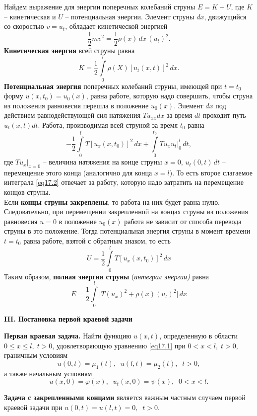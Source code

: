 Найдем выражение для энергии поперечных колебаний струны $E = K + U$, где $K$ -- кинетическая и $U$ -- потенциальная энергии. Элемент струны $dx$, движущийся со скоростью  $v = u_t$, обладает кинетической энергией 
$$
\frac{1}{2} m v^2 = \frac{1}{2} \rho(x) \,dx\, (u_t)^2.
$$
\textbf{Кинетическая энергия} всей струны равна
$$
K = \frac{1}{2}\int\limits_0^l \rho(X) [u_t(x,t)]^2 \, dx.
$$
\textbf{Потенциальная энергия} поперечных колебаний струны, имеющей при $t = t_0$ форму $u(x, t_0) = u_0(x)$, равна работе, которую надо совершить, чтобы струна из положения равновесия перешла в положение $u_0(x)$. Элемент $dx$ под действием равнодействующей сил натяжения $T u_{xx} dx$ за время $dt$ проходит путь $u_t(x, t) dt$. Работа, производимая всей струной за время $t_0$ равна
\begin{equation}\label{eq17.2}
    -\frac{1}{2} \int\limits_0^l T [u_x(x,t_0)]^2 \, dx + \int\limits_0^{t_0} T u_x u_t \bigg|_{0}^l \, dt,
\end{equation}
где $T u_x\big|_{x=0}$ -- величина натяжения на конце струны $x = 0$, $u_t(0, t)\, dt $ -- перемещение этого конца (аналогично для конца $x = l$). То есть второе слагаемое интеграла \eqref{eq17.2} отвечает за работу, которую надо затратить на перемещение концов струны. \\

Если \textbf{концы струны закреплены}, то работа на них будет равна нулю. 
Следовательно, при перемещении закрепленной на концах струны из положения равновесия $u=0$ в положение $u_0(x)$ работа не зависит от способа перевода струны в это положение.
Тогда потенциальная энергия струны в момент времени $t = t_0$ равна работе, взятой с обратным знаком, то есть 
$$
U = \frac{1}{2}\int\limits_0^l T [u_x(x,t_0)]^2 \, dx 
$$
Таким образом, \textbf{полная энергия струны} (\textit{интеграл энергии)} равна
\begin{equation}\label{eq17.3}
    E = \frac{1}{2}\int\limits_0^l \big[T (u_x)^2  + \rho(x) (u_t)^2\big]\, dx 
\end{equation}

\textbf{\quad III. Постановка первой краевой задачи}

\textbf{Первая краевая задача. }Найти функцию $u(x,t)$, определенную в области $0 \leq x \leq l, \; t > 0$, удовлетворяющую уравнению  \eqref{eq17.1} при $0 < x < l, \; t >0$, граничным условиям
$$
u(0, t) = \mu_1(t), \;\; u(l, t) = \mu_2(t), \;\; t> 0,
$$
а также начальным условиям
$$
u(x, 0) = \varphi(x), \;\; u_t(x,0) = \psi(x), \;\; 0<x<l.
$$

\textbf{Задача с закрепленными концами} является важным частным случаем первой краевой задачи при $u(0,t) = u(l, t) = 0, \;\; t> 0$.\\

